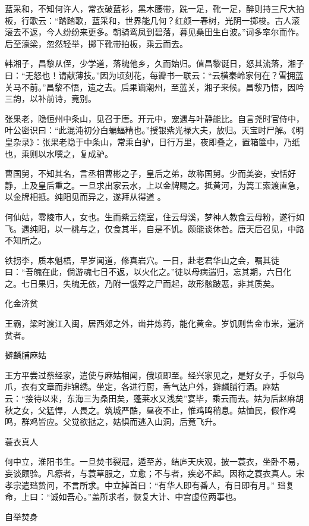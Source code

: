 \documentclass[a4paper,12pt,UTF8,twoside]{ctexbook}
\begin{document}
    蓝采和，不知何许人，常衣破蓝衫，黑木腰带，跣一足，靴一足，醉则持三尺大拍板，行歌云：“踏踏歌，蓝采和，世界能几何？红颜一春树，光阴一掷梭。古人滚滚去不返，今人纷纷来更多。朝骑鸾凤到碧落，暮见桑田生白波。”词多率尔而作。后至濠梁，忽然轻举，掷下靴带拍板，乘云而去。
    
    韩湘子，昌黎从侄，少学道，落魄他乡，久而始归。值昌黎诞日，怒其流落，湘子曰：“无怒也！请献薄技。”因为顷刻花，每瓣书一联云：“云横秦岭家何在？雪拥蓝关马不前。”昌黎不悟，遗之去。后果谪潮州，至蓝关，湘子来候。昌黎乃悟，因吟三韵，以补前诗，竟别。
    
    张果老，隐恒州中条山，见召于唐。开元中，宠遇与叶静能比。自言尧时官侍中，叶公密识曰：“此混沌初分白蝙蝠精也。”授银紫光禄大夫，放归。天宝时尸解。《明皇杂录》：张果老隐于中条山，常乘白驴，日行万里，夜即叠之，置箱箧中，乃纸也，乘则以水噀之，复成驴。
    
    曹国舅，不知其名，言丞相曹彬之子，皇后之弟，故称国舅。少而美姿，安恬好静，上及皇后重之。一旦求出家云水，上以金牌赐之。抵黄河，为篙工索渡直急，以金牌相抵。纯阳见而异之，遂拜从得道 。
    
    何仙姑，零陵市人，女也。生而紫云绕室，住云母溪，梦神人教食云母粉，遂行如飞。遇纯阳，以一桃与之，仅食其半，自是不饥。颇能谈休咎。唐天后召见，中路不知所之。
    
    铁拐李，质本魁梧，早岁闻道，修真岩穴。一日，赴老君华山之会，嘱其徒曰：“吾魄在此，倘游魂七日不返，以火化之。”徒以母病遄归，忘其期，六日化之。七日果归，失魄无依，乃附一饿殍之尸而起，故形骸跛恶，非其质矣。
    
    化金济贫
    
    王霸，梁时渡江入闽，居西郊之外，凿井炼药，能化黄金。岁饥则售金市米，遍济贫者。
    
    擗麟脯麻姑
    
    王方平尝过蔡经家，遣使与麻姑相闻，俄顷即至。经兴家见之，是好女子，手似鸟爪，衣有文章而非锦绣。坐定，各进行厨，香气达户外，擗麟脯行酒。麻姑云：“接待以来，东海三为桑田矣，蓬莱水又浅矣”宴毕，乘云而去。姑为后赵麻胡秋之女，父猛悍，人畏之。筑城严酷，昼夜不止，惟鸡鸣稍息。姑恤民，假作鸡鸣，群鸡皆应。父觉欲挞之，姑惧而逃入山洞，后竟飞升。
    
    蓑衣真人
    
    何中立，淮阳书生。一旦焚书裂冠，遁至苏，结庐天庆观，披一蓑衣，坐卧不易，妄谈颇验。凡瘵者，与蓑草服之，立愈；不与者，疾必不起。因称之蓑衣真人。宋孝宗遣珰贽问，不言所求。中立掉首曰：“有华人即有番人，有日即有月。” 珰复命，上曰：“诚如吾心。”盖所求者，恢复大计、中宫虚位两事也。
    
    自举焚身
    
\end{document}
